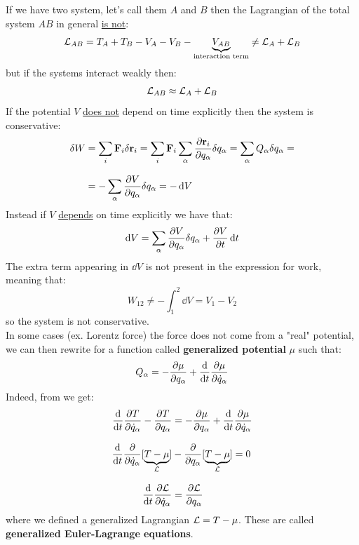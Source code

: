 If we have two system, let's call them $A$ and $B$ then the Lagrangian of the total system $AB$ in general \underline{is not}:
\begin{equation}
    \mathcal{L}_{AB} = T_A + T_B - V_A - V_B - \underbrace{V_{AB}}_{\text{interaction term}}\neq \mathcal{L}_A + \mathcal{L}_B
\end{equation}
but if the systems interact weakly then:
\begin{equation}
    \mathcal{L}_{AB} \approx \mathcal{L}_A + \mathcal{L}_B
\end{equation}
If the potential $V$ \underline{does not} depend on time explicitly then the system is conservative:
\begin{equation}
    \begin{split}
      \delta W &= \bigsum_i \vec{F}_i \delta \vec{r}_i = \bigsum_i \vec{F}_i \bigsum_{\alpha}\pdv{ \vec{r}_i}{ q_{\alpha}}\delta q_{\alpha} = \bigsum_{\alpha} Q_{\alpha}\delta q_{\alpha} = \\[8pt]
      &= -\bigsum_{\alpha} \pdv{V}{q_{\alpha}}\delta q_{\alpha} = -\dd{V}
    \end{split}
\end{equation}
Instead if $V$ \underline{depends} on time explicitly we have that:
\begin{equation}
    \dd{V} = \bigsum_{\alpha} \pdv{V}{q_{\alpha}}\delta q_{\alpha} + \pdv{ V}{ t}\dd{t}
\end{equation}
The extra term appearing in $\dd{V}$ is not present in the expression for work, meaning that:
\begin{equation}
    W_{12} \neq -\int_{1}^{2}\dd{V} = V_1 - V_2
\end{equation}
so the system is not conservative.\\
In some cases (ex. Lorentz force) the force does not come from a "real" potential, we can then rewrite \eleref\;for a function called \textbf{generalized potential} $\mu$ such that:
\begin{equation}
    Q_{\alpha} = -\pdv{ \mu}{ q_{\alpha}} +\dv{}{t}\pdv{ \mu}{ \dot{q}_{\alpha}}
\end{equation}
Indeed, from \lagrangeref\;we get:
\begin{equation}
    \begin{split}
      \dv{}{t}\pdv{ T}{ \dot{q}_{\alpha}} - \pdv{ T}{ q_{\alpha}} &= -\pdv{ \mu}{ q_{\alpha}} +\dv{}{t}\pdv{ \mu}{ \dot{q}_{\alpha}} \\[8pt]
      \dv{}{t}\pdv{ }{ \dot{q}_{\alpha}}[\underbrace{T-\mu}_{\lagr}] &- \pdv{}{ q_{\alpha}}[\underbrace{T-\mu}_{\lagr}] = 0 \\[8pt]
      \dv{}{t}\pdv{\lagr}{\dot{q}_{\alpha}} &= \pdv{\lagr}{q_{\alpha}}
    \end{split}
\end{equation}
where we defined a generalized Lagrangian $\mathcal{L} = T-\mu$. These are called \textbf{generalized Euler-Lagrange equations}.
